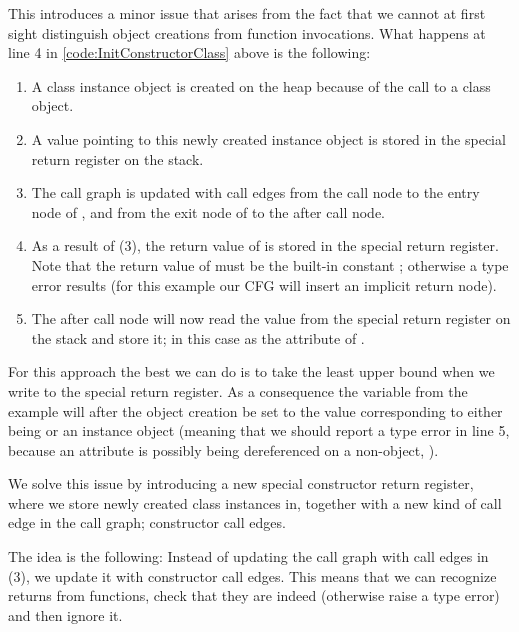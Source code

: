 This introduces a minor issue that arises from the fact that we cannot at first sight distinguish object creations from function invocations. What happens at line 4 in \autoref{code:InitConstructorClass} above is the following:

\begin{enumerate}
	\item A class instance object is created on the heap because of the call to a class object.
	\item A value pointing to this newly created instance object is stored in the special return register on the stack.
	\item The call graph is updated with call edges from the call node to the entry node of , and from the exit node of  to the after call node.
	\item As a result of (3), the return value of  is stored in the special return register. Note that the return value of  must be the built-in constant ; otherwise a type error results (for this example our CFG will insert an implicit return  node).
	\item The after call node will now read the value from the special return register on the stack and store it; in this case as the attribute  of .
\end{enumerate}

For this approach the best we can do is to take the least upper bound when we write to the special return register. As a consequence the variable  from the example will after the object creation be set to the value corresponding to either being  or an instance object (meaning that we should report a type error in line 5, because an attribute is possibly being dereferenced on a non-object, ).

We solve this issue by introducing a new special constructor return register, where we store newly created class instances in, together with a new kind of call edge in the call graph; constructor call edges.

The idea is the following: Instead of updating the call graph with call edges in (3), we update it with constructor call edges. This means that we can recognize returns from  functions, check that they are indeed  (otherwise raise a type error) and then ignore it.

